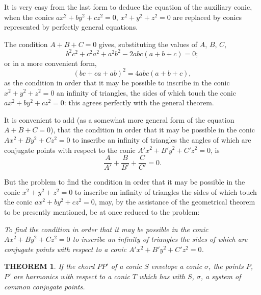 \documentclass[11pt,a4paper]{article}
\theoremstyle{plain}
\newtheorem{theorem}{THEOREM}
\begin{document}
It is very easy from the last form to deduce the equation of the auxiliary conic, when the conics $ax^2 + by^2 + cz^2 = 0$, $x^2 + y^2 + z^2 = 0$ are replaced by conics represented by perfectly general equations.

The condition $A + B + C = 0$ gives, substituting the values of $A$, $B$, $C$,
\[
b^2c^2 + c^2a^2 + a^2b^2 - 2abc(a+b+c) = 0;
\]
or in a more convenient form,
\[
(bc + ca + ab)^2 = 4abc(a + b + c),
\]
as the condition in order that it may be possible to inscribe in the conic $x^2 + y^2 + z^2 = 0$ an infinity of triangles, the sides of which touch the conic $ax^2 + by^2 + cz^2 = 0$: this agrees perfectly with the general theorem.

It is convenient to add (as a somewhat more general form of the equation $A+B+C=0$), that the condition in order that it may be possible in the conic $Ax^2 + By^2 + Cz^2 = 0$ to inscribe an infinity of triangles the angles of which are conjugate points with respect to the conic $A'x^2 + B'y^2 + C'z^2 = 0$, is
\[
\frac{A}{A'} + \frac{B}{B'} + \frac{C}{C'} = 0.
\]

But the problem to find the condition in order that it may be possible in the conic $x^2 + y^2 + z^2 = 0$ to inscribe an infinity of triangles the sides of which touch the conic $ax^2 + by^2 + cz^2 = 0$, may, by the assistance of the geometrical theorem to be presently mentioned, be at once reduced to the problem:

\textit{To find the condition in order that it may be possible in the conic $Ax^2 + By^2 + Cz^2 = 0$ to inscribe an infinity of triangles the sides of which are conjugate points with respect to a conic $A'x^2 + B'y^2 + C'z^2 = 0$.}

\begin{theorem}
If the chord $PP'$ of a conic $S$ envelope a conic $\sigma$, the points $P$, $P'$ are harmonics with respect to a conic $T$ which has with $S$, $\sigma$, a system of common conjugate points.
\end{theorem}
\end{document}
